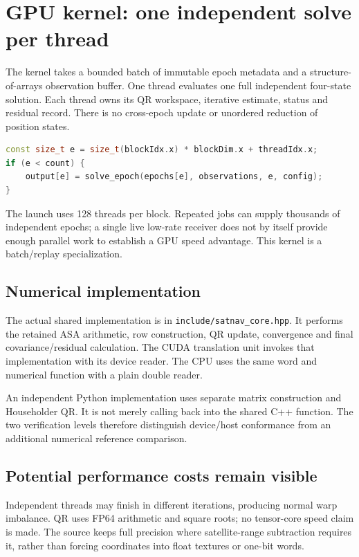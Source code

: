 \documentclass[11pt,a4paper]{article}
\newcommand{\code}[1]{\texttt{#1}}
\begin{document}
\section{GPU kernel: one independent solve per thread}
The kernel takes a bounded batch of immutable epoch metadata and a structure-of-arrays
observation buffer. One thread evaluates one full independent four-state solution.
Each thread owns its QR workspace, iterative estimate, status and residual record.
There is no cross-epoch update or unordered reduction of position states.

\begin{lstlisting}[language=C++]
const size_t e = size_t(blockIdx.x) * blockDim.x + threadIdx.x;
if (e < count) {
    output[e] = solve_epoch(epochs[e], observations, e, config);
}
\end{lstlisting}
The launch uses 128 threads per block. Repeated jobs can supply thousands of independent
epochs; a single live low-rate receiver does not by itself provide enough parallel work
to establish a GPU speed advantage. This kernel is a batch/replay specialization.

\subsection{Numerical implementation}
The actual shared implementation is in \code{include/satnav\_core.hpp}. It performs
the retained ASA arithmetic, row construction, QR update, convergence and final
covariance/residual calculation. The CUDA translation unit invokes that implementation
with its device reader. The CPU uses the same word and numerical function with a
plain double reader.

An independent Python implementation uses separate matrix construction and Householder
QR. It is not merely calling back into the shared C++ function. The two verification
levels therefore distinguish device/host conformance from an additional numerical
reference comparison.

\subsection{Potential performance costs remain visible}
Independent threads may finish in different iterations, producing normal warp
imbalance. QR uses FP64 arithmetic and square roots; no tensor-core speed claim is
made. The source keeps full precision where satellite-range subtraction requires it,
rather than forcing coordinates into float textures or one-bit words.
\end{document}
